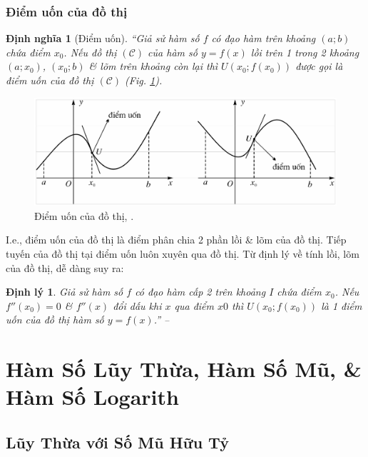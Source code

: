 \documentclass{article}
\numberwithin{equation}{section}
\newtheorem{dinhnghia}{Định nghĩa}[section]
\newtheorem{dinhly}{Định lý}[section]
\begin{document}
\subsubsection{Điểm uốn của đồ thị}

\begin{dinhnghia}[Điểm uốn]
	``Giả sử hàm số $f$ có đạo hàm trên khoảng $(a;b)$ chứa điểm $x_0$. Nếu đồ thị $(\mathcal{C})$ của hàm số $y = f(x)$ lồi trên 1 trong 2 khoảng $(a;x_0)$, $(x_0;b)$ \& lõm trên khoảng còn lại thì $U(x_0;f(x_0))$ được gọi là \emph{điểm uốn} của đồ thị $(\mathcal{C})$ (Fig. \ref{fig:diem_uon}).
\end{dinhnghia}

\begin{figure}[H]
	\centering
	\includegraphics[scale=0.2]{diem_uon}
	\caption{Điểm uốn của đồ thị, \cite[Hình 1.23, p. 60]{SGK_Toan_12_giai_tich_nang_cao}.}
	\label{fig:diem_uon}
\end{figure}
I.e., điểm uốn của đồ thị là điểm phân chia 2 phần lồi \& lõm của đồ thị. Tiếp tuyến của đồ thị tại điểm uốn luôn xuyên qua đồ thị. Từ định lý về tính lồi, lõm của đồ thị, dễ dàng suy ra:

\begin{dinhly}
	Giả sử hàm số $f$ có đạo hàm cấp 2 trên khoảng $I$ chứa điểm $x_0$. Nếu $f''(x_0) = 0$ \& $f''(x)$ đổi dấu khi $x$ qua điểm $x0$ thì $U(x_0;f(x_0))$ là 1 điểm uốn của đồ thị hàm số $y = f(x)$.'' -- \cite[p. 60]{SGK_Toan_12_giai_tich_nang_cao}
\end{dinhly}


\section{Hàm Số Lũy Thừa, Hàm Số Mũ, \& Hàm Số Logarith}

\subsection{Lũy Thừa với Số Mũ Hữu Tỷ}
\end{document}
